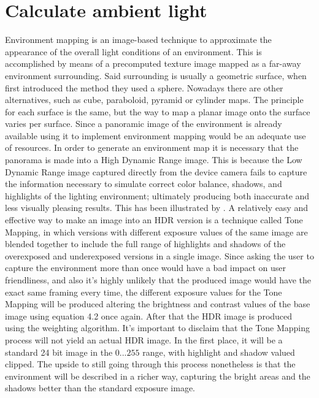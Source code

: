 \section{Calculate ambient light}
Environment mapping is an image-based technique to approximate the appearance of the overall light conditions of an environment. This is accomplished by means of a precomputed texture image mapped as a far-away environment surrounding. Said surrounding is usually a geometric surface, when \cite{Blinn76} first introduced the method they used a sphere. Nowadays there are other alternatives, such as cube, paraboloid, pyramid or cylinder maps. The principle for each surface is the same, but the way to map a planar image onto the surface varies per surface.\newline
Since a panoramic image of the environment is already available using it to implement environment mapping would be an adequate use of resources. In order to generate an environment map it is necessary that the panorama is made into a High Dynamic Range image. This is because the Low Dynamic Range image captured directly from the device camera fails to capture the information necessary to simulate correct color balance, shadows, and highlights of the lighting environment; ultimately producing both inaccurate and less visually pleasing results. This has been illustrated by \cite{DebevecRSO}.\newline 
A relatively easy and effective way to make an image into an HDR version is a technique called Tone Mapping, in which versions with different exposure values of the same image are blended together to include the full range of highlights and shadows of the overexposed and underexposed versions in a single image. Since asking the user to capture the environment more than once would have a bad impact on user friendliness, and also it's highly unlikely that the produced image would have the exact same framing every time, the different exposure values for the Tone Mapping will be produced altering the brightness and contrast values of the base image using equation 4.2 once again. After that the HDR image is produced using the \cite{Debevec} weighting algorithm.\newline
It's important to disclaim that the Tone Mapping process will not yield an actual HDR image. In the first place, it will be a standard 24 bit image in the $0...255$ range, with highlight and shadow valued clipped. The upside to still going through this process nonetheless is that the environment will be described in a richer way, capturing the bright areas and the shadows better than the standard exposure image.

